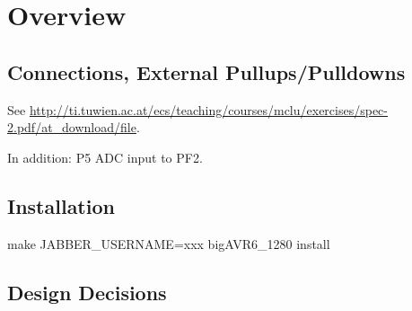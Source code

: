 \documentclass[12pt,a4paper,titlepage,oneside]{article}
\begin{document}
\MakeTitleAndTOC




\section{Overview}

\subsection{Connections,  External Pullups/Pulldowns}

See \hyperref[MCVU 2014 - Application 2 Specification]{http://ti.tuwien.ac.at/ecs/teaching/courses/mclu/exercises/spec-2.pdf/at\_download/file}.

In addition: P5 ADC input to PF2.

\subsection{Installation}

make JABBER\_USERNAME=xxx bigAVR6\_1280 install

\subsection{Design Decisions}
\end{document}
